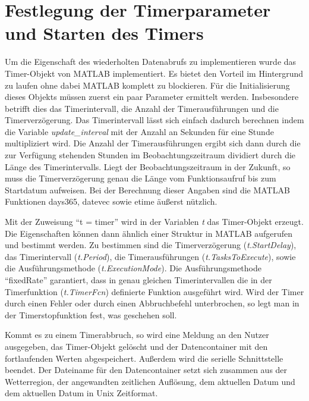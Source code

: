 \section{Festlegung der Timerparameter und Starten des Timers}

Um die Eigenschaft des wiederholten Datenabrufs zu implementieren wurde das Timer-Objekt von MATLAB implementiert. Es bietet den Vorteil im Hintergrund zu laufen ohne dabei MATLAB komplett zu blockieren. Für die Initialisierung dieses Objekts müssen zuerst ein paar Parameter ermittelt werden. Insbesondere betrifft dies das Timerintervall, die Anzahl der Timerausführungen und die Timerverzögerung. Das Timerintervall lässt sich einfach dadurch berechnen indem die Variable \textit{update\_interval} mit der Anzahl an Sekunden für eine Stunde multipliziert wird. Die Anzahl der Timerausführungen ergibt sich dann durch die zur Verfügung stehenden Stunden im Beobachtungszeitraum dividiert durch die Länge des Timerintervalls. Liegt der Beobachtungszeitraum in der Zukunft, so muss die Timerverzögerung genau die Länge vom Funktionsaufruf bis zum Startdatum aufweisen. Bei der Berechnung dieser Angaben sind die MATLAB Funktionen \textsf{days365}, \textsf{datevec} sowie \textsf{etime} äußerst nützlich.
    
Mit der Zuweisung \enquote{t = timer} wird in der Variablen \textit{t} das Timer-Objekt erzeugt. Die Eigenschaften können dann ähnlich einer Struktur in MATLAB aufgerufen und bestimmt werden. Zu bestimmen sind die Timerverzögerung (\textit{t.StartDelay}), das Timerintervall (\textit{t.Period}), die Timerausführungen (\textit{t.TasksToExecute}), sowie die Ausführungsmethode (\textit{t.ExecutionMode}). Die Ausführungsmethode \enquote{fixedRate} garantiert, dass in genau gleichen Timerintervallen die in der Timerfunktion (\textit{t.TimerFcn}) definierte Funktion ausgeführt wird. Wird der Timer durch einen Fehler oder durch einen Abbruchbefehl unterbrochen, so legt man in der Timerstopfunktion fest, was geschehen soll.
  
Kommt es zu einem Timerabbruch, so wird eine Meldung an den Nutzer ausgegeben, das Timer-Objekt gelöscht und der Datencontainer mit den fortlaufenden Werten abgespeichert. Außerdem wird die serielle Schnittstelle beendet. Der Dateiname für den Datencontainer setzt sich zusammen aus der Wetterregion, der angewandten zeitlichen Auflösung, dem aktuellen Datum und dem aktuellen Datum in Unix Zeitformat.    
